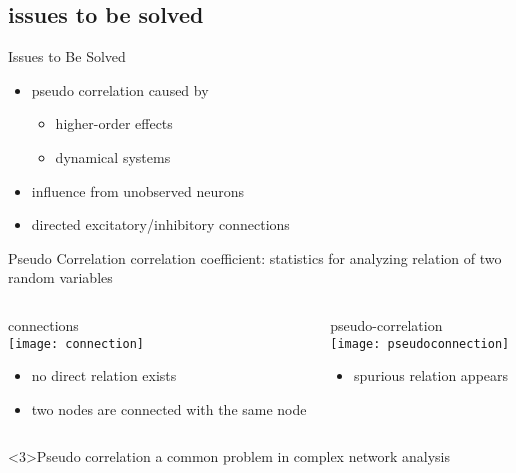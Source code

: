 \documentclass[fleqn,aspectratio=1610]{beamer}
\begin{document}
\subsection{issues to be solved}
\label{sec:orga1c5311}
\begin{frame}[label={sec:orgd66ecb3}]{Issues to Be Solved}
\begin{itemize}
\item pseudo correlation caused by
\begin{itemize}
\item higher-order effects
\item dynamical systems
\end{itemize}
\item influence from unobserved neurons
\item directed excitatory/inhibitory connections
\end{itemize}
\end{frame}

\begin{frame}[label={sec:orga37f925}]{Pseudo Correlation}
correlation coefficient:
statistics for analyzing relation of two random variables
\medskip
\begin{columns}
\begin{column}[t]{0.5\columnwidth}
\centering
connections \\[4pt]
\texttt{[image: connection]}

\begin{itemize}
\item no direct relation exists
\item two nodes are connected with the same node
\end{itemize}
\pause
\end{column}
\begin{column}[t]{0.5\columnwidth}
\centering
pseudo-correlation \\[4pt]
\texttt{[image: pseudoconnection]}

\begin{itemize}
\item spurious relation appears
\end{itemize}
\end{column}
\end{columns}
\begin{alertblock}<3>{Pseudo correlation}
a common problem in complex network analysis
\end{alertblock}
\end{frame}
\end{document}
